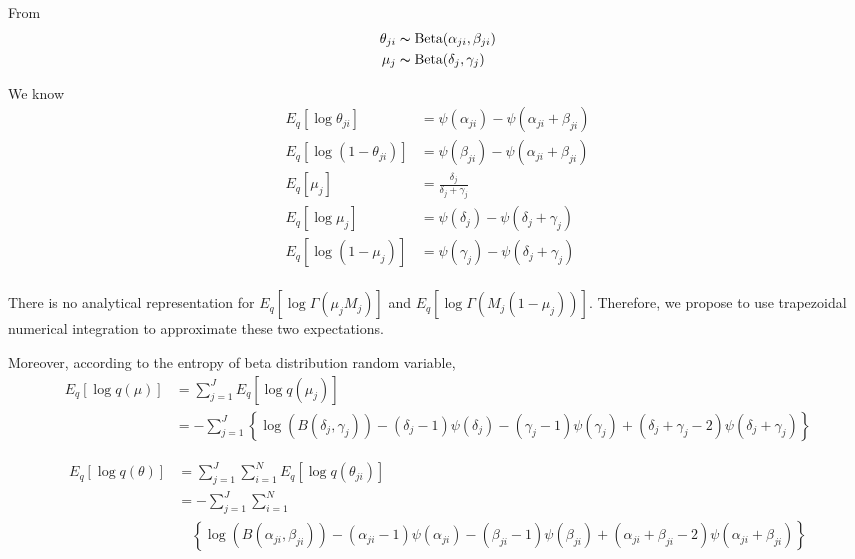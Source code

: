 \documentclass[11pt,reqno]{amsart}
\begin{document}

From 
\begin{align}
\theta_{ji} &\thicksim \text{Beta}(\alpha_{ji}, \beta_{ji}) \nonumber \\
\mu_j &\thicksim \text{Beta}(\delta_j, \gamma_j) \nonumber
\end{align}

We know
\begin{align}
E_q \left[ \log \theta_{ji} \right] &= \psi(\alpha_{ji}) - \psi(\alpha_{ji}+\beta_{ji}) \nonumber \\
E_q\left[ \log \left( 1 - \theta_{ji}\right) \right]&= \psi(\beta_{ji}) - \psi(\alpha_{ji}+\beta_{ji}) \nonumber \nonumber \\
E_q \left[ \mu_j \right] &= \frac{\delta_j}{\delta_j + \gamma_j} \nonumber \\
E_q  \left[ \log \mu_j \right] &= \psi(\delta_j) - \psi(\delta_j+\gamma_j) \nonumber \\
E_q  \left[ \log (1 - \mu_j)\right] &= \psi(\gamma_j) - \psi(\delta_j+\gamma_j)\nonumber \\
\end{align}

There is no analytical representation for $  E_q  \left[ \log \Gamma(\mu_j M_j) \right] $ and $ E_q  \left[ \log \Gamma(M_j (1-\mu_j)) \right] $. Therefore, we propose to use trapezoidal numerical integration to approximate these two expectations.


Moreover, according to the entropy of beta distribution random variable,
\begin{equation}
\begin{split}
E_q \left[ \log q\left(\mu \right)\right] &= \sum_{j=1}^{J} E_q \left[ \log q(\mu_j)\right] \\
&= -\sum_{j=1}^{J} \left\lbrace \log (B(\delta_j,\gamma_j))-(\delta_j-1)\psi(\delta_j)-(\gamma_j-1)\psi(\gamma_j)
+ (\delta_j+\gamma_j-2)\psi(\delta_j+\gamma_j)\right\rbrace 
\end{split}
\end{equation}

\begin{equation}
\begin{split}
E_q \left[ \log q\left(\theta \right)\right] &= \sum_{j=1}^{J}\sum_{i=1}^{N} E_q\left[ \log q(\theta_{ji})\right] \\
&= -\sum_{j=1}^{J}\sum_{i=1}^{N} \\
&\quad \left\lbrace \log (B(\alpha_{ji},\beta_{ji}))-(\alpha_{ji}-1)\psi(\alpha_{ji})-(\beta_{ji}-1)\psi(\beta_{ji})
+ (\alpha_{ji}+\beta_{ji}-2)\psi(\alpha_{ji}+\beta_{ji})\right\rbrace 
\end{split}
\end{equation}
\end{document}
